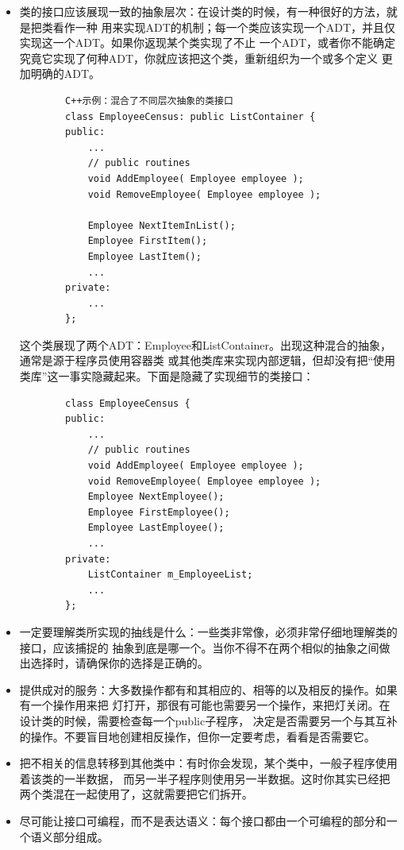 \documentclass{article}
\begin{document}
\begin{itemize}
    \item 类的接口应该展现一致的抽象层次：在设计类的时候，有一种很好的方法，就是把类看作一种
    用来实现ADT的机制；每一个类应该实现一个ADT，并且仅实现这一个ADT。如果你返现某个类实现了不止
    一个ADT，或者你不能确定究竟它实现了何种ADT，你就应该把这个类，重新组织为一个或多个定义
    更加明确的ADT。
    \begin{lstlisting}
        C++示例：混合了不同层次抽象的类接口
        class EmployeeCensus: public ListContainer {
        public:
            ...
            // public routines
            void AddEmployee( Employee employee );
            void RemoveEmployee( Employee employee );

            Employee NextItemInList();
            Employee FirstItem();
            Employee LastItem();
            ...
        private:
            ...
        };
    \end{lstlisting}
    这个类展现了两个ADT：Employee和ListContainer。出现这种混合的抽象，通常是源于程序员使用容器类
    或其他类库来实现内部逻辑，但却没有把“使用类库”这一事实隐藏起来。下面是隐藏了实现细节的类接口：
    \begin{lstlisting}
        class EmployeeCensus {
        public:
            ...
            // public routines
            void AddEmployee( Employee employee );
            void RemoveEmployee( Employee employee );
            Employee NextEmployee();
            Employee FirstEmployee();
            Employee LastEmployee();
            ...
        private:
            ListContainer m_EmployeeList;
            ...
        };
    \end{lstlisting}
    \item 一定要理解类所实现的抽线是什么：一些类非常像，必须非常仔细地理解类的接口，应该捕捉的
    抽象到底是哪一个。当你不得不在两个相似的抽象之间做出选择时，请确保你的选择是正确的。
    \item 提供成对的服务：大多数操作都有和其相应的、相等的以及相反的操作。如果有一个操作用来把
    灯打开，那很有可能也需要另一个操作，来把灯关闭。在设计类的时候，需要检查每一个public子程序，
    决定是否需要另一个与其互补的操作。不要盲目地创建相反操作，但你一定要考虑，看看是否需要它。
    \item 把不相关的信息转移到其他类中：有时你会发现，某个类中，一般子程序使用着该类的一半数据，
    而另一半子程序则使用另一半数据。这时你其实已经把两个类混在一起使用了，这就需要把它们拆开。
    \item 尽可能让接口可编程，而不是表达语义：每个接口都由一个可编程的部分和一个语义部分组成。

\end{itemize}
\end{document}
